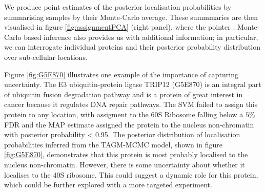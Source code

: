 \documentclass[12pt,english]{article}\usepackage[]{graphicx}\usepackage[]{color}
\begin{document}
We produce point estimates of the posterior localisation probabilities
by summarising samples by their Monte-Carlo average.  These summmaries
are then visualised in figure \ref{fig:assignmentPCA} (right panel),
where the pointer {\color{black}{is scaled according to the localisation
probabilities of the sub-cellular niche with the largest posterior
probability}}. Monte-Carlo based inference also provides us with
additional information; in particular, we can interrogate individual
proteins and their posterior probability distribution over
sub-cellular locations.

Figure \ref{fig:G5E870} illustrates one example of the importance of
capturing uncertainty.  The E3 ubiquitin-protein ligase TRIP12
(G5E870) is an integral part of ubiquitin fusion degradation pathway
and is a protein of great interest in cancer because it regulates DNA
repair pathways. The SVM failed to assign this protein to any
location, with assigment to the 60S Ribosome falling below a $5\%$ FDR
and the MAP estimate assigned the protein to the nucleus non-chromatin
with posterior probability < 0.95.  The posterior distribution of
localisation probabilities inferred from the TAGM-MCMC model, shown in
figure \ref{fig:G5E870}, demonstrates that this protein is most
probably localised to the nucleus non-chromatin. However, there is
some uncertainty about whether it localises to the $40$S ribosome.
This could suggest a dynamic role for this protein, which could be
further explored with a more targeted experiment.
\end{document}
